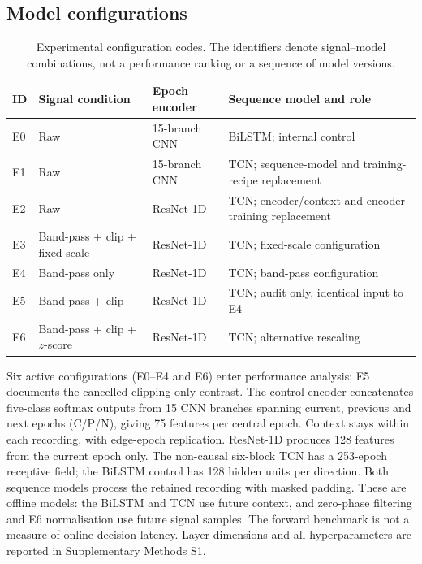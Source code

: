 \documentclass[11pt,a4paper]{article}
\begin{document}
\subsection{Model configurations}

\begin{table}[t]
\centering
\caption{Experimental configuration codes. The identifiers denote signal--model combinations, not a
performance ranking or a sequence of model versions.}
\label{tab:configs}
\small
\begin{tabularx}{\textwidth}{llYY}
\toprule
\textbf{ID} & \textbf{Signal condition} & \textbf{Epoch encoder} & \textbf{Sequence model and role} \\
\midrule
E0 & Raw & 15-branch CNN & BiLSTM; internal control \\
E1 & Raw & 15-branch CNN & TCN; sequence-model and training-recipe replacement \\
E2 & Raw & ResNet-1D & TCN; encoder/context and encoder-training replacement \\
E3 & Band-pass + clip + fixed scale & ResNet-1D & TCN; fixed-scale configuration \\
E4 & Band-pass only & ResNet-1D & TCN; band-pass configuration \\
E5 & Band-pass + clip & ResNet-1D & TCN; audit only, identical input to E4 \\
E6 & Band-pass + clip + $z$-score & ResNet-1D & TCN; alternative rescaling \\
\bottomrule
\end{tabularx}
\end{table}

Six active configurations (E0--E4 and E6) enter performance analysis; E5 documents the cancelled
clipping-only contrast. The control encoder concatenates five-class softmax outputs from 15 CNN branches
spanning current, previous and next epochs (C/P/N), giving 75 features per central epoch.
Context stays within each recording, with edge-epoch replication. ResNet-1D produces 128 features from the current epoch only. The
non-causal six-block TCN has a 253-epoch receptive field; the BiLSTM control has 128 hidden units per
direction. Both sequence models process the retained recording with masked padding. These are offline
models: the BiLSTM and TCN use future context, and zero-phase filtering and E6 normalisation use future
signal samples. The forward benchmark is not a measure of online decision latency. Layer dimensions and
all hyperparameters are reported in Supplementary Methods S1.
\end{document}
